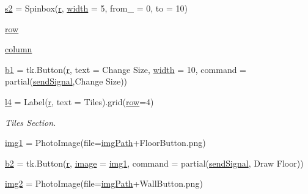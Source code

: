 \begin{DoxyCompactItemize}
\item 
\mbox{\hyperlink{namespace_g_u_i_a9b4f27a5e87a161111559dd8e38219d4}{s2}} = Spinbox(\mbox{\hyperlink{_s_d_l__opengl_8h_a42ce7cdc612e53abee15043f80220d97}{r}}, \mbox{\hyperlink{_s_d_l__opengl_8h_a9a82cf3caff84cabc4598e2619faac17}{width}} = 5, from\+\_\+ = 0, to = 10)
\item 
\mbox{\hyperlink{namespace_g_u_i_a50392865479db3a869a19c926d474f1f}{row}}
\item 
\mbox{\hyperlink{namespace_g_u_i_a4d9166e323570c16afa5de2e7bd788af}{column}}
\item 
\mbox{\hyperlink{namespace_g_u_i_a329472468460bb661747b9e01449d184}{b1}} = tk.\+Button(\mbox{\hyperlink{_s_d_l__opengl_8h_a42ce7cdc612e53abee15043f80220d97}{r}}, text = \textquotesingle{}Change Size\textquotesingle{}, \mbox{\hyperlink{_s_d_l__opengl_8h_a9a82cf3caff84cabc4598e2619faac17}{width}} = 10, command = partial(\mbox{\hyperlink{namespace_g_u_i_ae82f740e6453cdd542b52ede1560c2c3}{send\+Signal}},\textquotesingle{}Change Size\textquotesingle{}))
\item 
\mbox{\hyperlink{namespace_g_u_i_ac505e29343a8c79d7347a8be5c4fffa5}{l4}} = Label(\mbox{\hyperlink{_s_d_l__opengl_8h_a42ce7cdc612e53abee15043f80220d97}{r}}, text = \textquotesingle{}Tiles\textquotesingle{}).grid(\mbox{\hyperlink{_s_d_l__opengl__glext_8h_a90d3e7e4182a9630993f640fa0443b0b}{row}}=4)
\begin{DoxyCompactList}\small\item\em Tiles Section. \end{DoxyCompactList}\item 
\mbox{\hyperlink{namespace_g_u_i_a2b9af2e6ceeadebce40ff8171633d86c}{img1}} = Photo\+Image(file=\mbox{\hyperlink{namespace_g_u_i_a293e22c0a27a45862ad50fcb8ed12f15}{img\+Path}}+\textquotesingle{}Floor\+Button.\+png\textquotesingle{})
\item 
\mbox{\hyperlink{namespace_g_u_i_ac572e0369b73d3b0493771239995d91d}{b2}} = tk.\+Button(\mbox{\hyperlink{_s_d_l__opengl_8h_a42ce7cdc612e53abee15043f80220d97}{r}}, \mbox{\hyperlink{_s_d_l__opengl_8h_a0a221b005894579fea3b9eb7bfc2ee71}{image}} = \mbox{\hyperlink{namespace_g_u_i_a2b9af2e6ceeadebce40ff8171633d86c}{img1}}, command = partial(\mbox{\hyperlink{namespace_g_u_i_ae82f740e6453cdd542b52ede1560c2c3}{send\+Signal}}, \textquotesingle{}Draw Floor\textquotesingle{}))
\item 
\mbox{\hyperlink{namespace_g_u_i_a49cad6894844031f41a996947032a4a4}{img2}} = Photo\+Image(file=\mbox{\hyperlink{namespace_g_u_i_a293e22c0a27a45862ad50fcb8ed12f15}{img\+Path}}+\textquotesingle{}Wall\+Button.\+png\textquotesingle{})

\end{DoxyCompactItemize}
